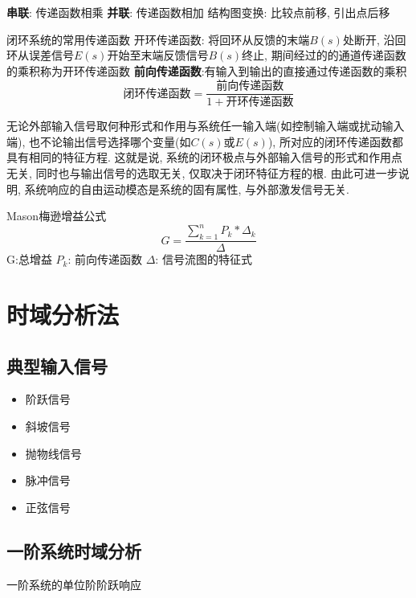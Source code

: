 \documentclass{article}
\begin{document}
\textbf{串联}: 传递函数相乘 \newline
\textbf{并联}: 传递函数相加 \newline
结构图变换: 比较点前移, 引出点后移


闭环系统的常用传递函数\newline
开环传递函数: 将回环从反馈的末端$B(s)$处断开, 沿回环从误差信号$E(s)$开始至末端反馈信号$B(s)$终止, 期间经过的的通道传递函数的乘积称为开环传递函数\newline
\textbf{前向传递函数}:有输入到输出的直接通过传递函数的乘积
\begin{equation}
		\text{闭环传递函数} = \frac{\text{前向传递函数}}{1+\text{开环传递函数}}
\end{equation}

无论外部输入信号取何种形式和作用与系统任一输入端(如控制输入端或扰动输入端), 也不论输出信号选择哪个变量(如$C(s)$或$E(s)$), 所对应的闭环传递函数都具有相同的特征方程. \newline
这就是说, 系统的闭环极点与外部输入信号的形式和作用点无关, 同时也与输出信号的选取无关, 仅取决于闭环特征方程的根.\newline
由此可进一步说明, 系统响应的自由运动模态是系统的固有属性, 与外部激发信号无关.


Mason梅逊增益公式
\begin{equation}
		G = \frac{\sum_{k=1}^n P_k * \Delta_k}{\Delta}
\end{equation}
G:总增益\newline
$P_k$: 前向传递函数\newline
$\Delta$: 信号流图的特征式

\section{时域分析法}
\subsection{典型输入信号}
\begin{itemize}
	\item 阶跃信号
	\item 斜坡信号
	\item 抛物线信号
	\item 脉冲信号
	\item 正弦信号
\end{itemize}

\subsection{一阶系统时域分析}
一阶系统的单位阶阶跃响应
\end{document}
